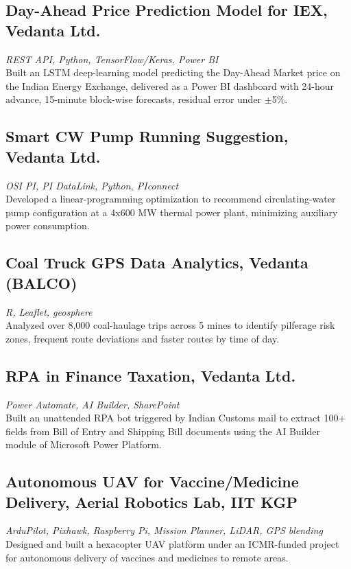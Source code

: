 \documentclass[11pt,a4paper]{article}
\begin{document}
\subsection*{Day-Ahead Price Prediction Model for IEX, Vedanta Ltd.}
\textit{REST API, Python, TensorFlow/Keras, Power BI} \\
Built an LSTM deep-learning model predicting the Day-Ahead Market price on the
Indian Energy Exchange, delivered as a Power BI dashboard with 24-hour advance,
15-minute block-wise forecasts, residual error under $\pm$5\%.

\subsection*{Smart CW Pump Running Suggestion, Vedanta Ltd.}
\textit{OSI PI, PI DataLink, Python, PIconnect} \\
Developed a linear-programming optimization to recommend circulating-water pump
configuration at a 4x600 MW thermal power plant, minimizing auxiliary power
consumption.

\subsection*{Coal Truck GPS Data Analytics, Vedanta (BALCO)}
\textit{R, Leaflet, geosphere} \\
Analyzed over 8,000 coal-haulage trips across 5 mines to identify pilferage
risk zones, frequent route deviations and faster routes by time of day.

\subsection*{RPA in Finance Taxation, Vedanta Ltd.}
\textit{Power Automate, AI Builder, SharePoint} \\
Built an unattended RPA bot triggered by Indian Customs mail to extract 100+
fields from Bill of Entry and Shipping Bill documents using the AI Builder
module of Microsoft Power Platform.

\subsection*{Autonomous UAV for Vaccine/Medicine Delivery, Aerial Robotics Lab, IIT KGP}
\textit{ArduPilot, Pixhawk, Raspberry Pi, Mission Planner, LiDAR, GPS blending} \\
Designed and built a hexacopter UAV platform under an ICMR-funded project for
autonomous delivery of vaccines and medicines to remote areas.
\end{document}
